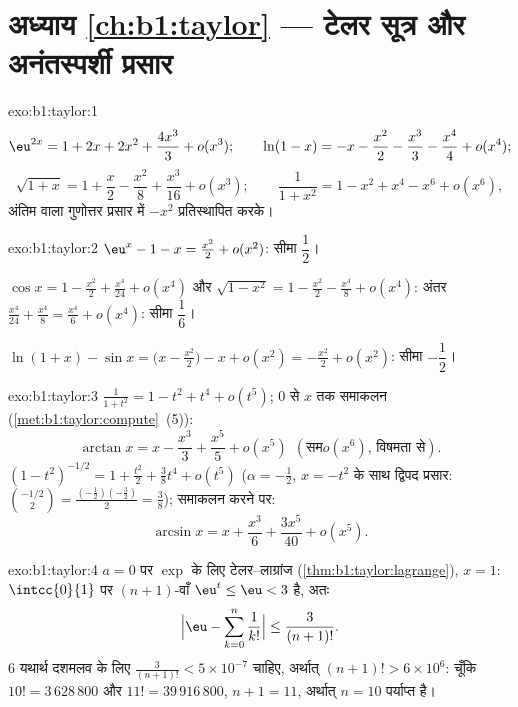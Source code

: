 \section*{अध्याय \ref{ch:b1:taylor} --- टेलर सूत्र और अनंतस्पर्शी प्रसार}

\begin{solution}{exo:b1:taylor:1}
\[
\eu^{2x} = 1 + 2x + 2x^2 + \frac{4x^3}{3} + o(x^3);
\qquad
\ln(1 - x) = -x - \frac{x^2}{2} - \frac{x^3}{3} - \frac{x^4}{4} +
o(x^4);
\]
\[
\sqrt{1+x} = 1 + \frac x2 - \frac{x^2}{8} + \frac{x^3}{16} + o(x^3);
\qquad
\frac{1}{1 + x^2} = 1 - x^2 + x^4 - x^6 + o(x^6),
\]
अंतिम वाला गुणोत्तर प्रसार में $-x^2$ प्रतिस्थापित करके।
\end{solution}

\begin{solution}{exo:b1:taylor:2}
$\eu^x - 1 - x = \frac{x^2}{2} + o(x^2)$: सीमा $\dfrac12$।

$\cos x = 1 - \frac{x^2}{2} + \frac{x^4}{24} + o(x^4)$ और $\sqrt{1 - x^2} =
1 - \frac{x^2}{2} - \frac{x^4}{8} + o(x^4)$: अंतर $\frac{x^4}{24} +
\frac{x^4}{8} = \frac{x^4}{6} + o(x^4)$: सीमा $\dfrac16$।

$\ln(1+x) - \sin x = \bigl(x - \frac{x^2}{2}\bigr) - x + o(x^2) =
-\frac{x^2}{2} + o(x^2)$: सीमा $-\dfrac12$।
\end{solution}

\begin{solution}{exo:b1:taylor:3}
$\frac{1}{1+t^2} = 1 - t^2 + t^4 + o(t^5)$; $0$ से $x$ तक समाकलन
(\cref{met:b1:taylor:compute}~(5)):
\[
\arctan x = x - \frac{x^3}{3} + \frac{x^5}{5} + o(x^5)\ \ (\text{सम}o(x^6)\text{, विषमता से}).
\]
$(1 - t^2)^{-1/2} = 1 + \frac{t^2}{2} + \frac38 t^4 + o(t^5)$ ($\alpha =
-\frac12$, $x = -t^2$ के साथ द्विपद प्रसार: $\binom{-1/2}{2} =
\frac{(-\frac12)(-\frac32)}{2} = \frac38$); समाकलन करने पर:
\[
\arcsin x = x + \frac{x^3}{6} + \frac{3x^5}{40} + o(x^5) .
\]
\end{solution}

\begin{solution}{exo:b1:taylor:4}
$a = 0$ पर $\exp$ के लिए टेलर--लाग्रांज (\cref{thm:b1:taylor:lagrange}), $x
= 1$: $\intcc{0}{1}$ पर $(n+1)$-वाँ  $\eu^t \leq \eu < 3$ है, अतः
\[
\Bigl|\eu - \sum_{k=0}^{n} \frac{1}{k!}\Bigr| \leq
\frac{3}{(n+1)!} .
\]
$6$ यथार्थ दशमलव के लिए $\frac{3}{(n+1)!} < 5\times 10^{-7}$ चाहिए, अर्थात्
$(n+1)! > 6\times 10^{6}$: चूँकि $10! = 3\,628\,800$ और $11! =
39\,916\,800$, $n + 1 = 11$, अर्थात् $n = 10$ पर्याप्त है।
\end{solution}

